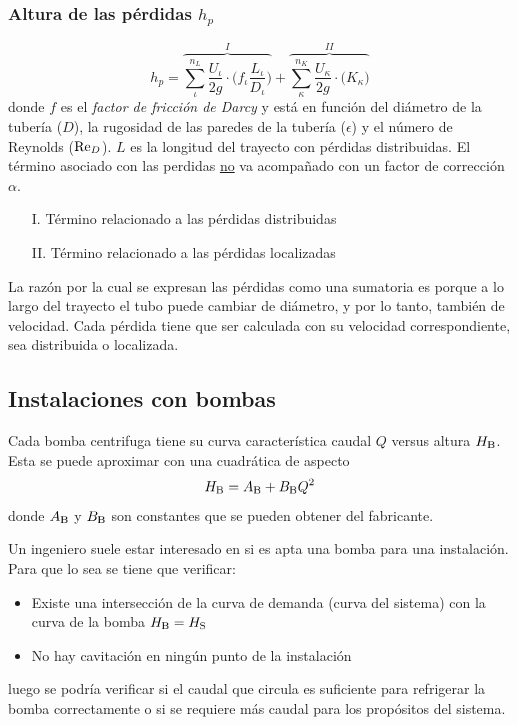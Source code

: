 \subsubsection*{Altura de las pérdidas $h_p$}
\vspace{-.75cm}
\begin{equation} \label{eq:alturaPerdidas}
    h_p=\overbrace{\sum^{n_L}_\iota \frac{U_\iota}{2g} \cdot \bigg(f_\iota\frac{L_\iota}{D_\iota}\bigg)}^{I}+\overbrace{\sum^{n_K}_\kappa \frac{U_\kappa}{2g} \cdot \big(K_\kappa\big)}^{II}
\end{equation}
donde $f$ es el \textit{factor de fricción de Darcy} y está en función del diámetro de la tubería ($D$), la rugosidad de las paredes de la tubería ($\epsilon$) y el número de Reynolds ($\textrm{Re}_D$). $L$ es la longitud del trayecto con pérdidas distribuidas. El término asociado con las perdidas \underline{no} va acompañado con un factor de corrección $\alpha$. 
\begin{itemize}
    \item[I.] Término relacionado a las pérdidas distribuidas
    \vspace{-.2cm}
    \item[II.] Término relacionado a las pérdidas localizadas
\end{itemize}
La razón por la cual se expresan las pérdidas como una sumatoria es porque a lo largo del trayecto el tubo puede cambiar de diámetro, y por lo tanto, también de velocidad. Cada pérdida tiene que ser calculada con su velocidad correspondiente, sea distribuida o localizada.

\subsection{Instalaciones con bombas}

Cada bomba centrifuga tiene su curva característica caudal $Q$ versus altura $H_{\RM{B}}$. Esta se puede aproximar con una cuadrática de aspecto
\begin{equation}
    H_{\RM{B}} = A_{\RM{B}}+B_{\RM{B}} Q^2
\end{equation}
donde $A_{\RM{B}}$ y $B_{\RM{B}}$ son constantes que se pueden obtener del fabricante.

Un ingeniero suele estar interesado en si es apta una bomba para una instalación. Para que lo sea se tiene que verificar:
\begin{itemize}
    \item Existe una intersección de la curva de demanda (curva del sistema) con la curva de la bomba $H_{\RM{B}} = H_{\RM{S}}$
    \item No hay cavitación en ningún punto de la instalación
\end{itemize}
luego se podría verificar si el caudal que circula es suficiente para refrigerar la bomba correctamente o si se requiere más caudal para los propósitos del sistema.

